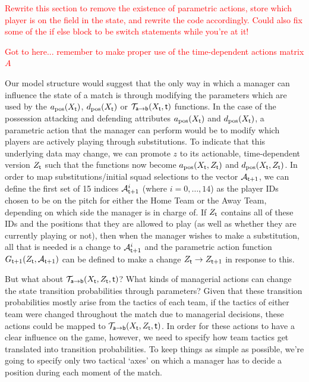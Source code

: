 \textcolor{red}{Rewrite this section to remove the existence of parametric actions, store which player is on the field in the state, and rewrite the code accordingly. Could also fix some of the if else block to be switch statements while you're at it!}

\textcolor{red}{Got to here... remember to make proper use of the time-dependent actions matrix $A$}


Our model structure would suggest that the only way in which a manager can influence the state of a match is through modifying the parameters which are used by the $a_{\rm pos}(X_{\sf t})$, $d_{\rm pos}(X_{\sf t})$ or ${\cal T}_{{\sf a}\rightarrow {\sf b}}(X_{\sf t},{\sf t})$ functions. In the case of the possession attacking and defending attributes $a_{\rm pos}(X_{\sf t})$ and $d_{\rm pos}(X_{\sf t})$, a parametric action that the manager can perform would be to modify which players are actively playing through substitutions. To indicate that this underlying data may change, we can promote $z$ to its actionable, time-dependent version $Z_{{\sf t}}$ such that the functions now become $a_{\rm pos}(X_{\sf t},Z_{\sf t})$ and $d_{\rm pos}(X_{\sf t},Z_{\sf t})$. In order to map substitutions/initial squad selections to the vector ${\cal A}_{{\sf t}+1}$, we can define the first set of 15 indices ${\cal A}_{{\sf t}+1}^i$ (where $i=0,\dots , 14$) as the player IDs chosen to be on the pitch for either the {\sf Home Team} or the {\sf Away Team}, depending on which side the manager is in charge of. If $Z_{\sf t}$ contains all of these IDs and the positions that they are allowed to play (as well as whether they are currently playing or not), then when the manager wishes to make a substitution, all that is needed is a change to ${\cal A}_{{\sf t}+1}^i$ and the parametric action function $G_{{\sf t}+1}(Z_{\sf t},{\cal A}_{{\sf t}+1})$ can be defined to make a change $Z_{\sf t}\rightarrow Z_{{\sf t}+1}$ in response to this.

But what about ${\cal T}_{{\sf a}\rightarrow {\sf b}}(X_{\sf t},Z_{\sf t},{\sf t})$? What kinds of managerial actions can change the state transition probabilities through parameters? Given that these transition probabilities mostly arise from the tactics of each team, if the tactics of either team were changed throughout the match due to managerial decisions, these actions could be mapped to ${\cal T}_{{\sf a}\rightarrow {\sf b}}(X_{\sf t},Z_{\sf t},{\sf t})$. In order for these actions to have a clear influence on the game, however, we need to specify how team tactics get translated into transition probabilities. To keep things as simple as possible, we're going to specify only two tactical `axes' on which a manager has to decide a position during each moment of the match.

